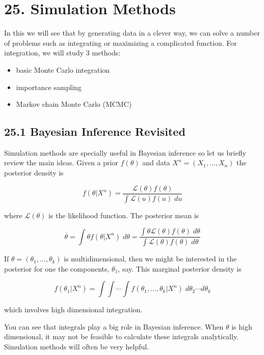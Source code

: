 \section*{25. Simulation Methods}\label{simulations:methods}

In this we will see that by generating data in a clever way, we can
solve a number of problems such as integrating or maximizing a
complicated function. For integration, we will study 3 methods:

\begin{itemize}[tightlist]
\item
  basic Monte Carlo integration
\item
  importance sampling
\item
  Markov chain Monte Carlo (MCMC)
\end{itemize}

\subsection*{25.1 Bayesian Inference Revisited}\label{bayesian-inference-revisited}

Simulation methods are specially useful in Bayesian inference so let us
briefly review the main ideas. Given a prior \(f(\theta)\) and data
\(X^{n} = (X_{1}, \dots, X_{n})\) the posterior density is

\[ f(\theta | X^{n}) = \frac{\mathcal{L}(\theta) f(\theta)}{ \int \mathcal{L}(u) f(u) \; du} \]

where \(\mathcal{L}(\theta)\) is the likelihood function. The posterior
mean is

\[ \overline{\theta} = \int \theta f(\theta | X^{n}) \; d\theta = \frac{\int \theta \mathcal{L}(\theta) f(\theta) \; d\theta}{\int \mathcal{L}(\theta) f(\theta) \; d\theta} \]

If \(\theta = (\theta_{1}, \dots, \theta_{k})\) is multidimensional, then we
might be interested in the posterior for one the components,
\(\theta_{1}\), say. This marginal posterior density is

\[ f(\theta_{1} | X^{n}) = \int \int \cdots \int f(\theta_{1}, \dots, \theta_{k} | X^{n}) \; d\theta_{2} \cdots d\theta_{k}\]

which involves high dimensional integration.

You can see that integrals play a big role in Bayesian inference. When
\(\theta\) is high dimensional, it may not be feasible to calculate
these integrals analytically. Simulation methods will often be very
helpful.

